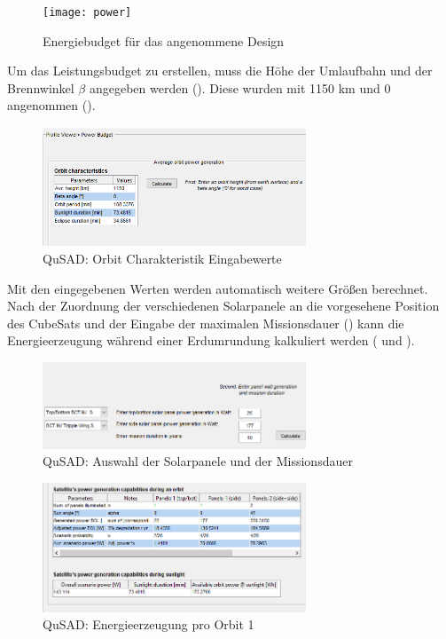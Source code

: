 										\begin{figure}[!h]
											\centering
												\texttt{[image: power]}
											\caption{Energiebudget für das angenommene Design}
											\label{fig:power}
										\end{figure}
Um das Leistungsbudget zu erstellen, muss die Höhe der Umlaufbahn und der Brennwinkel $\beta$ angegeben werden (). Diese wurden mit 1150 km und 0\textdegree{} angenommen ().\\
\begin{figure}[!h]
	\centering
		\includegraphics[width=0.70\textwidth]{graphics/power1.png}
	\caption{QuSAD: Orbit Charakteristik Eingabewerte}
	\label{fig:power1}
\end{figure}
Mit den eingegebenen Werten werden automatisch weitere Größen berechnet. Nach der Zuordnung der verschiedenen Solarpanele an die vorgesehene Position des CubeSats und der Eingabe der maximalen Missionsdauer () kann die Energieerzeugung während einer Erdumrundung kalkuliert werden ( und ).\\										

		 \begin{figure}[!h]
				\centering
					\includegraphics[width=0.70\textwidth]{graphics/power2.PNG}
				\caption{QuSAD: Auswahl der Solarpanele und der Missionsdauer}
				\label{fig:power2}
			\end{figure}
			
			\begin{figure}[!h]
				\centering
					\includegraphics[width=0.70\textwidth]{graphics/power3.png}
				\caption{QuSAD: Energieerzeugung pro Orbit 1}
				\label{fig:power3}
			\end{figure}
			
